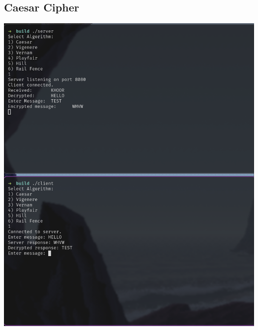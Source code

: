 \documentclass[titlepage]{article}
\begin{document}
\subsection{Caesar Cipher}
\includegraphics[scale=0.4]{caesar.png}
\end{document}
